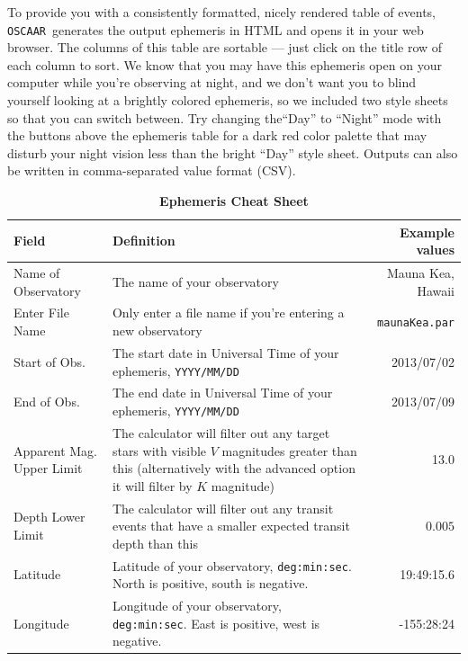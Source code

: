\documentclass[a4paper]{article}
\newcommand{\code}[1]{\texttt{#1}}
\newcommand{\oscaar}{\code{OSCAAR}~}
\begin{document}
To provide you with a consistently formatted, nicely rendered table of events, \oscaar generates the output ephemeris in HTML and opens it in your web browser. The columns of this table are sortable --- just click on the title row of each column to sort. We know that you may have this ephemeris open on your computer while you're observing at night, and we don't want you to blind yourself looking at a brightly colored ephemeris, so we included two style sheets so that you can switch between. Try changing the``Day'' to ``Night'' mode with the buttons above the ephemeris table for a dark red color palette that may disturb your night vision less than the bright ``Day'' style sheet. Outputs can also be written in comma-separated value format (CSV).

\pagebreak
\begin{table}[H]
\renewcommand{\arraystretch}{1.5}
\centering
\caption{\textbf{Ephemeris Cheat Sheet}}
\begin{tabular}{p{0.8in} |  p{3.2in} r}
Field & Definition & Example values\\
\hline\hline
Name of Observatory & The name of your observatory & Mauna Kea, Hawaii\\
Enter File Name & Only enter a file name if you're entering a new observatory & \code{maunaKea.par}\\
Start of Obs. & The start date in Universal Time of your ephemeris, \code{YYYY/MM/DD} & 2013/07/02\\
End of Obs. & The end date in Universal Time of your ephemeris, \code{YYYY/MM/DD} &  2013/07/09\\
Apparent Mag. Upper Limit & The calculator will filter out any target stars with visible $V$ magnitudes greater than this (alternatively with the advanced option it will filter by $K$ magnitude) & 13.0\\
Depth Lower Limit & The calculator will filter out any transit events that have a smaller expected transit depth than this& $0.005$\\
\hline 
Latitude & Latitude of your observatory, \code{deg:min:sec}. North is positive, south is negative. & 19:49:15.6\\
Longitude & Longitude of your observatory, \code{deg:min:sec}. East is positive, west is negative. & -155:28:24\\

\end{tabular}
\end{table}
\end{document}
